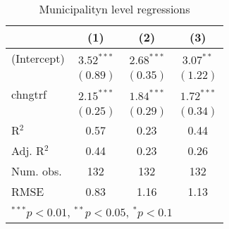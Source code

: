 
\begin{table}
\caption{Municipalityn level regressions}
\begin{center}
\begin{tabular}{l c c c }
\hline
 & (1) & (2) & (3) \\
\hline
(Intercept) & $3.52^{***}$ & $2.68^{***}$ & $3.07^{**}$  \\
            & $(0.89)$     & $(0.35)$     & $(1.22)$     \\
chngtrf     & $2.15^{***}$ & $1.84^{***}$ & $1.72^{***}$ \\
            & $(0.25)$     & $(0.29)$     & $(0.34)$     \\
\hline
R$^2$       & 0.57         & 0.23         & 0.44         \\
Adj. R$^2$  & 0.44         & 0.23         & 0.26         \\
Num. obs.   & 132          & 132          & 132          \\
RMSE        & 0.83         & 1.16         & 1.13         \\
\hline
\multicolumn{4}{l}{\scriptsize{$^{***}p<0.01$, $^{**}p<0.05$, $^*p<0.1$}}
\end{tabular}
\label{table:coefficients}
\end{center}
\end{table}
